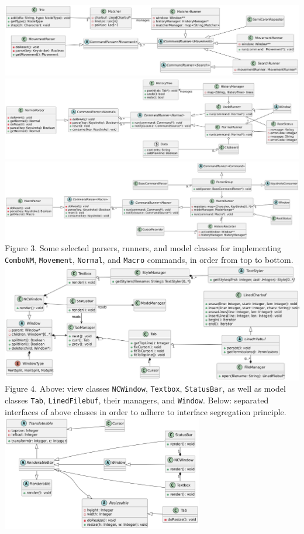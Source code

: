 \documentclass{article}
\begin{document}
\\\includegraphics[width=\textwidth]{uml3}
\\\includegraphics[width=\textwidth]{uml5}
\\\includegraphics[width=\textwidth]{uml6}
Figure 3. Some selected parsers, runners, and model classes 
for implementing \texttt{ComboNM}, \texttt{Movement}, 
\texttt{Normal}, and \texttt{Macro} commands, in order from top to bottom. 
\\\includegraphics[width=\textwidth]{uml7}
Figure 4. Above: view classes \texttt{NCWindow}, \texttt{Textbox}, \texttt{StatusBar}, 
as well as model classes \texttt{Tab}, \texttt{LinedFilebuf}, 
their managers, and \texttt{Window}. 
Below: separated interfaces of above classes 
in order to adhere to interface segregation principle. 
\\\includegraphics[width=250pt]{uml8}
\end{document}
